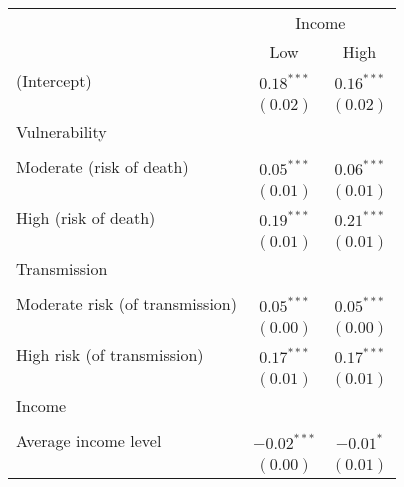 
\begin{table}
\begin{center}
\begin{scriptsize}
\begin{tabular}{l c c}
\hline
 & \multicolumn{2}{c}{Income} \\
\cline{2-3}
 & Low & High \\
\hline
(Intercept)                                     & $0.18^{***}$  & $0.16^{***}$  \\
                                                & $(0.02)$      & $(0.02)$      \\
Vulnerability                                   &               &               \\
                                                &               &               \\
\quad Moderate (risk of death)                  & $0.05^{***}$  & $0.06^{***}$  \\
                                                & $(0.01)$      & $(0.01)$      \\
\quad High (risk of death)                      & $0.19^{***}$  & $0.21^{***}$  \\
                                                & $(0.01)$      & $(0.01)$      \\
Transmission                                    &               &               \\
                                                &               &               \\
\quad Moderate risk (of transmission)           & $0.05^{***}$  & $0.05^{***}$  \\
                                                & $(0.00)$      & $(0.00)$      \\
\quad High risk (of transmission)               & $0.17^{***}$  & $0.17^{***}$  \\
                                                & $(0.01)$      & $(0.01)$      \\
Income                                          &               &               \\
                                                &               &               \\
\quad Average income level                      & $-0.02^{***}$ & $-0.01^{*}$   \\
                                                & $(0.00)$      & $(0.01)$      \\

\end{tabular}
\end{scriptsize}
\end{center}
\end{table}
